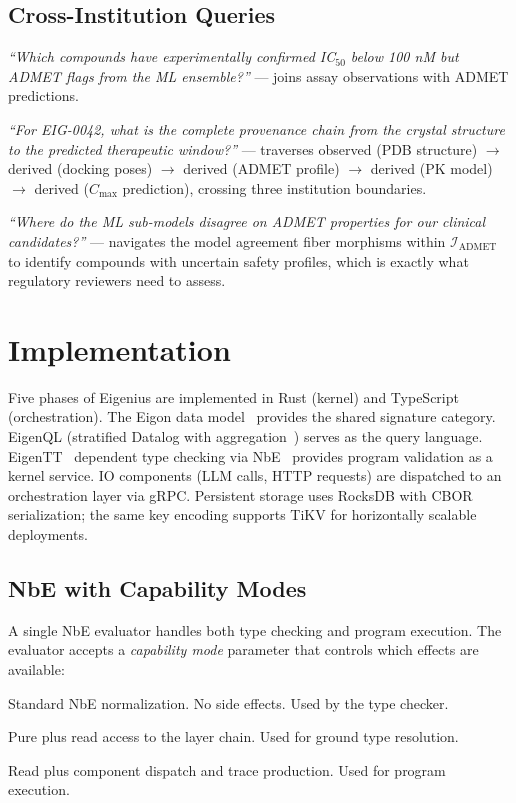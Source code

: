 \documentclass[10pt,twocolumn,letterpaper]{article}
\begin{document}
\subsection{Cross-Institution Queries}

\emph{``Which compounds have experimentally confirmed IC$_{50}$ below 100 nM but ADMET flags from the ML ensemble?''} --- joins assay observations with ADMET predictions.

\emph{``For EIG-0042, what is the complete provenance chain from the crystal structure to the predicted therapeutic window?''} --- traverses observed (PDB structure) $\to$ derived (docking poses) $\to$ derived (ADMET profile) $\to$ derived (PK model) $\to$ derived ($C_{\max}$ prediction), crossing three institution boundaries.

\emph{``Where do the ML sub-models disagree on ADMET properties for our clinical candidates?''} --- navigates the model agreement fiber morphisms within $\mathcal{I}_{\text{ADMET}}$ to identify compounds with uncertain safety profiles, which is exactly what regulatory reviewers need to assess.


\section{Implementation}
\label{sec:impl}

Five phases of Eigenius are implemented in Rust (kernel) and TypeScript (orchestration).
The Eigon data model~\cite{atomicdata} provides the shared signature category.
EigenQL (stratified Datalog with aggregation~\cite{alice}) serves as the query language.
EigenTT~\cite{minitt} dependent type checking via NbE~\cite{nbe} provides program validation as a kernel service.
IO components (LLM calls, HTTP requests) are dispatched to an orchestration layer via gRPC.
Persistent storage uses RocksDB with CBOR~\cite{rfc8949} serialization; the same key encoding supports TiKV for horizontally scalable deployments.

\subsection{NbE with Capability Modes}

A single NbE evaluator handles both type checking and program execution.
The evaluator accepts a \emph{capability mode} parameter that controls which effects are available:

\begin{description}[style=unboxed,leftmargin=0em]
\item[Pure] Standard NbE normalization. No side effects. Used by the type checker.
\item[Read] Pure plus read access to the layer chain. Used for ground type resolution.
\item[IO] Read plus component dispatch and trace production. Used for program execution.
\end{description}
\end{document}
